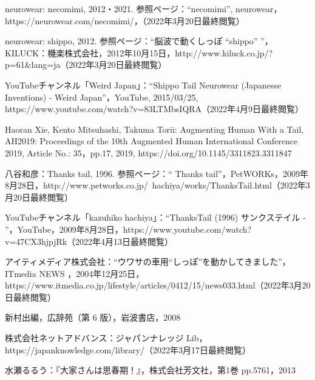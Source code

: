 \documentclass[a4paper]{jsarticle}
\begin{document}
\begin{thebibliography}{999}

\begin{flushleft}
  neurowear: necomimi, 2012・2021. 参照ページ：“necomimi”, neurowear，https://neurowear.com/necomimi/，（2022年3月20日最終閲覧）
\end{flushleft}

  neurowear: shippo, 2012. 参照ページ：“脳波で動くしっぽ “shippo” ”，KILUCK：機楽株式会社，2012年10月15日，http://www.kiluck.co.jp/?p=61\&lang=ja（2022年3月20日最終閲覧）
  
 \begin{flushleft}
 YouTubeチャンネル「Weird Japan」：“Shippo Tail Neurowear (Japanesse Inventions) - Weird Japan”，YouTube, 2015/03/25, https://www.youtube.com/watch?v=83LTMbsIQRA（2022年4月9日最終閲覧）
 \end{flushleft}

  Haoran Xie, Kento Mitsuhashi, Takuma Torii: Augmenting Human With a Tail, AH2019: Proceedings of the 10th Augmented Human International Conference 2019, Article No.: 35，pp.17, 2019, https://doi.org/10.1145/3311823.3311847

八谷和彦：Thanks tail, 1996. 参照ページ：“ Thanks tail”，PetWORKs，2009年8月28日，http://www.petworks.co.jp/~hachiya/works/ThanksTail.html（2022年3月20日最終閲覧）

YouTubeチャンネル「kazuhiko hachiya」：“ThanksTail (1996) サンクステイル - ”，YouTube，2009年8月28日，https://www.youtube.com/watch?v=47CX3hjpjRk（2022年4月13日最終閲覧）
  
\begin{flushleft}
アイティメディア株式会社：“ウワサの車用“しっぽ”を動かしてきました”， ITmedia NEWS ，2004年12月25日，https://www.itmedia.co.jp/lifestyle/articles/0412/15/news033.html（2022年3月20日最終閲覧）
\end{flushleft}

新村出編，広辞苑（第 6 版），岩波書店，2008

\begin{flushleft}
株式会社ネットアドバンス：ジャパンナレッジ Lib，https://japanknowledge.com/library/（2022年3月17日最終閲覧）
\end{flushleft}

水瀬るるう：『大家さんは思春期！』，株式会社芳文社，第1巻 pp.5761，2013


\end{thebibliography}
\end{document}
